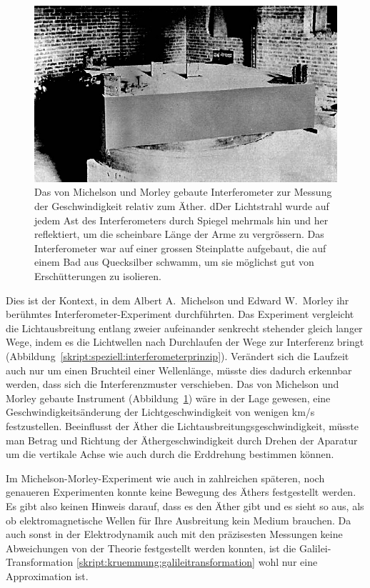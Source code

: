 \begin{figure}
\centering
\includegraphics[width=\hsize]{chapters/images/MichelsonMorleyExperiment1887.jpg}
\caption{Das von Michelson und Morley gebaute Interferometer zur Messung
der Geschwindigkeit relativ zum Äther.
dDer Lichtstrahl wurde auf jedem Ast des Interferometers durch Spiegel
mehrmals hin und her reflektiert, um die scheinbare Länge der Arme
zu vergrössern.
Das Interferometer war auf einer grossen Steinplatte aufgebaut, die auf einem
Bad aus Quecksilber schwamm, um sie möglichst gut von Erschütterungen zu
isolieren.
\label{MMinterferometer}}
\end{figure}
Dies ist der Kontext, in dem Albert A.~Michelson und Edward W.~Morley
ihr berühmtes Interfero\-meter-Experiment durchführten.
Das Experiment vergleicht die Lichtausbreitung entlang zweier aufeinander
senkrecht stehender gleich langer Wege, indem es die Lichtwellen nach 
Durchlaufen der Wege zur Interferenz bringt
(Abbildung~\ref{skript:speziell:interferometerprinzip}).
Verändert sich die Laufzeit auch nur um einen Bruchteil einer Wellenlänge,
müsste dies dadurch erkennbar werden, dass sich die Interferenzmuster
verschieben.
Das von Michelson und Morley gebaute Instrument
(Abbildung~\ref{MMinterferometer}) wäre in der Lage
gewesen, eine Geschwindigkeitsänderung der Lichtgeschwindigkeit von
wenigen km/s festzustellen.
Beeinflusst der Äther die Lichtausbreitungsgeschwindigkeit, müsste 
man Betrag und Richtung der Äthergeschwindigkeit durch Drehen der
Aparatur um die vertikale Achse wie auch durch die Erddrehung
bestimmen können.

Im Michelson-Morley-Experiment wie auch in zahlreichen späteren, noch
genaueren Experimenten konnte keine Bewegung des Äthers festgestellt
werden.
Es gibt also keinen Hinweis darauf, dass es den Äther gibt und es
sieht so aus, als ob elektromagnetische Wellen für Ihre Ausbreitung
kein Medium brauchen.
Da auch sonst in der Elektrodynamik auch mit den präzisesten Messungen
keine Abweichungen von der Theorie festgestellt werden konnten,
ist die Galilei-Transformation
\eqref{skript:kruemmung:galileitransformation} wohl nur eine
Approximation ist.

